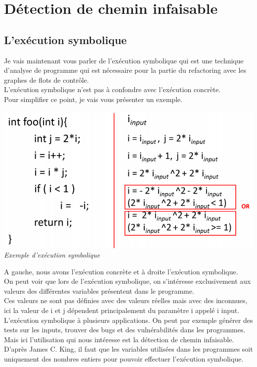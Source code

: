 \documentclass[a4paper,twoside,12pt,openright]{report}
\begin{document}
\newpage
\section{Détection de chemin infaisable}

\subsection{L'exécution symbolique}
Je vais maintenant vous parler de l’exécution symbolique qui est une technique d’analyse de programme qui est nécessaire pour la partie du refactoring avec les graphes de flots de contrôle.\\
L’exécution symbolique n’est pas à confondre avec l’exécution concrète.\\
Pour simplifier ce point, je vais vous présenter un exemple.\\

\begin{center}
\includegraphics[scale=0.8]{Image/ExempleExecutionSymbolique.png}\\
\itshape{Exemple d'exécution symbolique \cite{ref15}}
\end{center}

A gauche, nous avons l’exécution concrète et à droite l’exécution symbolique.\\
On peut voir que lors de l’exécution symbolique, on s’intéresse exclusivement aux valeurs des différentes variables présentent dans le programme.\\
Ces valeurs ne sont pas définies avec des valeurs réelles mais avec des inconnues, ici la valeur de i et j dépendent principalement du paramètre i appelé i input.\\
L’exécution symbolique à plusieurs applications.
On peut par exemple générer des tests sur les inputs, trouver des bugs et des vulnérabilités dans les programmes.\\
Mais ici l’utilisation qui nous intéresse est la détection de chemin infaisable.\cite{ref15}\\
D’après James C. King, il faut que les variables utilisées dans les programmes soit uniquement des nombres entiers pour pouvoir effectuer l’exécution symbolique.\cite{ref16}
\end{document}
